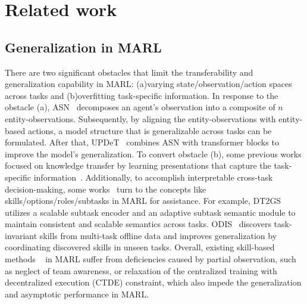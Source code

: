 \section{Related work}
\label{Related work}
\subsection{Generalization in MARL}
There are two significant obstacles that limit the transferability and generalization capability in MARL: (a)varying state/observation/action spaces across tasks and (b)overfitting task-specific information. In response to the obstacle (a), ASN~\cite{wang2019action} decomposes an agent's observation into a composite of $n$ entity-observations. Subsequently, by aligning the entity-observations with entity-based actions, a model structure that is generalizable across tasks can be formulated. After that, UPDeT~\cite{hu2021updet} combines ASN with transformer blocks to improve the model's generalization. To convert obstacle (b), some previous works focused on knowledge transfer by learning presentations that capture the task-specific information~\cite{xu2023improving,qin2022multi,schafer2022learning,liu2019value}. Additionally, to accomplish interpretable cross-task decision-making, some works~\cite{zhang2022discovering,Decompose_Tian} turn to the concepts like skills/options/roles/subtasks in MARL for assistance. For example, DT2GS~\cite{Decompose_Tian} utilizes a scalable subtask encoder and an adaptive subtask semantic module to maintain consistent and scalable semantics across tasks. ODIS~\cite{zhang2022discovering} discovers task-invariant skills from multi-task offline data and improves generalization by coordinating discovered skills in unseen tasks. Overall, existing skill-based methods ~\cite{yang2022ldsa,chen2022multi,yang2024hierarchical,yang2019hierarchical,wang2020roma,wang2020rode,liu2022heterogeneous} in MARL suffer from deficiencies caused by partial observation, such as neglect of team awareness, or relaxation of the centralized training with decentralized execution (CTDE) constraint, which also impede the generalization and asymptotic performance in MARL. 
